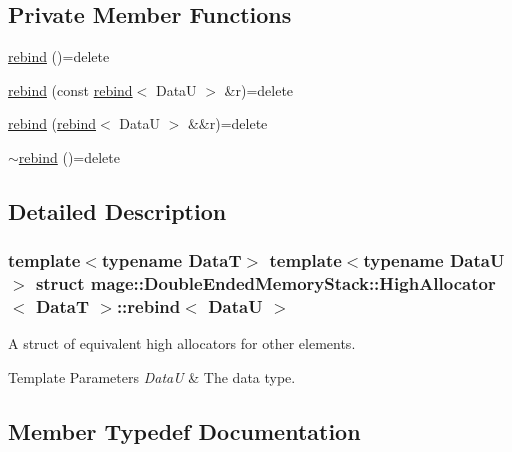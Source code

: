 \subsection*{Private Member Functions}
\begin{DoxyCompactItemize}
\item 
\hyperlink{structmage_1_1_double_ended_memory_stack_1_1_high_allocator_1_1rebind_ae8b23efa6f7435efbab9add1ce097c99}{rebind} ()=delete
\item 
\hyperlink{structmage_1_1_double_ended_memory_stack_1_1_high_allocator_1_1rebind_ae66cf8819a74c5c874b7e13df7ddd9f9}{rebind} (const \hyperlink{structmage_1_1_double_ended_memory_stack_1_1_high_allocator_1_1rebind}{rebind}$<$ DataU $>$ \&r)=delete
\item 
\hyperlink{structmage_1_1_double_ended_memory_stack_1_1_high_allocator_1_1rebind_a282a02984b0c2600e66dee32f9839cf9}{rebind} (\hyperlink{structmage_1_1_double_ended_memory_stack_1_1_high_allocator_1_1rebind}{rebind}$<$ DataU $>$ \&\&r)=delete
\item 
\hyperlink{structmage_1_1_double_ended_memory_stack_1_1_high_allocator_1_1rebind_a6773f76027334ab9887e27d71dfe40f7}{$\sim$rebind} ()=delete
\end{DoxyCompactItemize}


\subsection{Detailed Description}
\subsubsection*{template$<$typename DataT$>$\newline
template$<$typename DataU$>$\newline
struct mage\+::\+Double\+Ended\+Memory\+Stack\+::\+High\+Allocator$<$ Data\+T $>$\+::rebind$<$ Data\+U $>$}

A struct of equivalent high allocators for other elements.


\begin{DoxyTemplParams}{Template Parameters}
{\em DataU} & The data type. \\
\hline
\end{DoxyTemplParams}


\subsection{Member Typedef Documentation}
\hypertarget{structmage_1_1_double_ended_memory_stack_1_1_high_allocator_1_1rebind_aee127399c76826ea9b23986ee10f19fa}{}\label{structmage_1_1_double_ended_memory_stack_1_1_high_allocator_1_1rebind_aee127399c76826ea9b23986ee10f19fa} 
